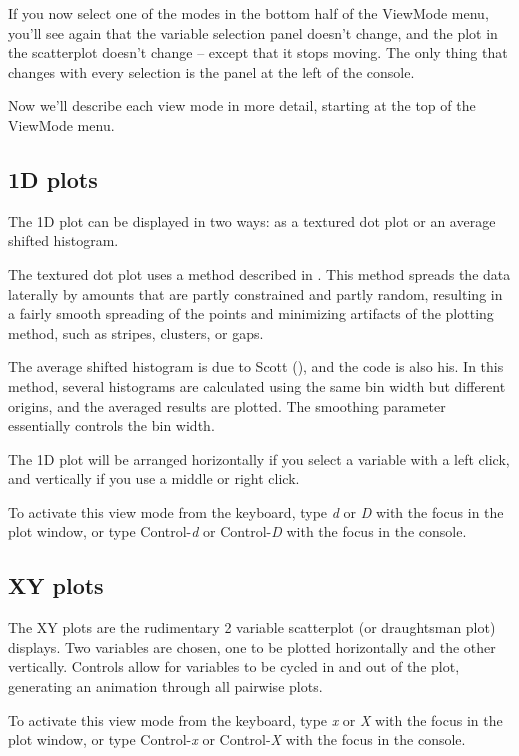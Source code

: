 \documentclass[11pt]{article}
\begin{document}
If you now select one of the modes in the bottom half of the ViewMode
menu, you'll see again that the variable selection panel doesn't
change, and the plot in the scatterplot doesn't change -- except
that it stops moving.  The only thing that changes with every
selection is the panel at the left of the console.

Now we'll describe each view mode in more detail, starting at the
top of the ViewMode menu. 

\subsection{1D plots}

The 1D plot can be displayed in two ways:  as a textured dot plot
or an average shifted histogram.

The textured dot plot uses a method described in
\cite{TukeyTukey90}.  This method spreads the data laterally by
amounts that are partly constrained and partly random, resulting in a
fairly smooth spreading of the points and minimizing artifacts of the
plotting method, such as stripes, clusters, or gaps.

The average shifted histogram is due to Scott (\cite{Scott92}),
and the code is also his.  In this method, several histograms are
calculated using the same bin width but different origins, and the
averaged results are plotted.  The smoothing parameter essentially
controls the bin width.

The 1D plot will be arranged horizontally if you select a variable
with a left click, and vertically if you use a middle or right click.

To activate this view mode from the keyboard, type {\em d} or {\em D}
with the focus in the plot window, or type Control-{\em d} or
Control-{\em D} with the focus in the console.

\subsection{XY plots}

The XY plots are the rudimentary 2 variable scatterplot (or
draughtsman plot) displays. Two variables are chosen, one to be
plotted horizontally and the other vertically. Controls allow for
variables to be cycled in and out of the plot, generating an animation
through all pairwise plots.

To activate this view mode from the keyboard, type {\em x} or {\em X}
with the focus in the plot window, or type Control-{\em x} or
Control-{\em X} with the focus in the console.
\end{document}
